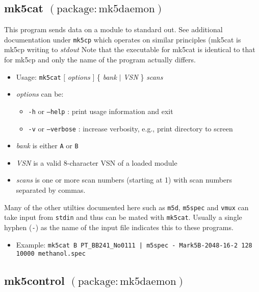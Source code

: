 
\subsection{mk5cat {\small $\mathrm{(package: mk5daemon)}$}} \label{sec:mk5cat}

This program sends data on a module to standard out.
See additional documentation under {\tt mk5cp} which operates on similar principles (mk5cat is mk5cp writing to {\em stdout}
Note that the executable for mk5cat is identical to that for mk5cp and only the name of the program actually differs.

\begin{itemize}
\item[] Usage: {\tt mk5cat} $[$ {\em options} $]$ \{ {\em bank} $\mid$ {\em VSN} \} {\em scans}
\item[] {\em options} can be:
\begin{itemize}
\item[] {\tt -h} or {\tt --help} : print usage information and exit
\item[] {\tt -v} or {\tt --verbose} : increase verbosity, e.g., print directory to screen
\end{itemize}
\item[] {\em bank} is either {\tt A} or {\tt B}
\item[] {\em VSN} is a valid 8-character VSN of a loaded module
\item[] {\em scans} is one or more scan numbers (starting at 1) with scan numbers separated by commas.
\end{itemize}

Many of the other utilties documented here such as {\tt m5d}, {\tt m5spec} and {\tt vmux} can take input from {\tt stdin} and thus can be mated with {\tt mk5cat}.
Usually a single hyphen ({\tt -}) as the name of the input file indicates this to these programs.

\begin{itemize}
\item[] Example: {\tt mk5cat B PT\_BB241\_No0111 | m5spec - Mark5B-2048-16-2 128 10000 methanol.spec}
\end{itemize}






\subsection{mk5control {\small $\mathrm{(package: mk5daemon)}$}} \label{sec:mk5control} 

